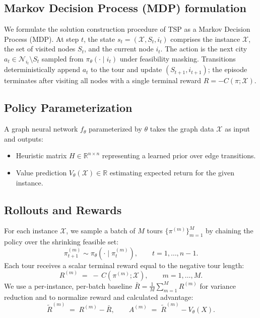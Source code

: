 \documentclass[a4paper,conference]{IEEEtran}
\newcommand{\RR}{\mathbb{R}}
\begin{document}
\subsection{Markov Decision Process (MDP) formulation}
We formulate the solution construction procedure of TSP as a Markov Decision Process (MDP). At step $t$, the state $s_t=(\mathcal{X}, S_t, i_t)$ comprises the instance $\mathcal{X}$, the set of visited nodes $S_t$, and the current node $i_t$.
The action is the next city $a_t\in \mathcal{N}_{i_t}\setminus S_t$ sampled from $\pi_\theta(\cdot\mid i_t)$ under feasibility masking.
Transitions deterministically append $a_t$ to the tour and update $(S_{t+1}, i_{t+1})$; the episode terminates after visiting all nodes with a single terminal reward $R=-C(\pi;\mathcal{X})$.

\subsection{Policy Parameterization}
A graph neural network $f_{\theta}$ parameterized by $\theta$ takes the graph data $\mathcal{X}$ as input and outputs:
\begin{itemize}
  \item Heuristic matrix $H\in\RR^{n\times n}$ representing a learned prior over edge transitions.
  \item Value prediction $  V_{\theta}(\mathcal{X})\in\RR$ estimating expected return for the given instance.
\end{itemize}

\subsection{Rollouts and Rewards}
For each instance $\mathcal{X}$, we sample a batch of $M$ tours
$\{\pi^{(m)}\}_{m=1}^{M}$ by chaining the policy over the shrinking feasible set:
\[
\pi^{(m)}_{t+1} \sim \pi_\theta(\cdot \mid \pi^{(m)}_t), 
\qquad t=1,\dots,n-1.
\]
Each tour receives a scalar terminal reward equal to the negative tour length:
\begin{equation}
R^{(m)} \;=\; -\, C(\pi^{(m)};\mathcal{X}), 
\qquad m=1,\dots,M.
\end{equation}
We use a per-instance, per-batch baseline $\bar R = \frac{1}{M}\sum_{m=1}^M R^{(m)}$ for variance reduction and to normalize reward and calculated advantage:
\begin{equation}
\tilde R^{(m)} \;=\; R^{(m)} - \bar R, 
\qquad
A^{(m)} \;=\; \tilde R^{(m)} - V_\theta(X).
\end{equation}
\end{document}
